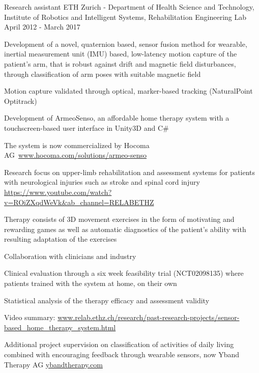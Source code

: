 \begin{cventries}
  \cventry
    {Research assistant} %
    {ETH Zurich - Department of Health Science and Technology, Institute of Robotics and Intelligent Systems, Rehabilitation Engineering Lab} %
    {} %
    {April 2012 - March 2017} %
    {
      \begin{cvitems} %
        \item{Development of a novel, quaternion based, {sensor fusion} method for wearable, inertial measurement unit ({IMU}) based, low-latency motion capture of the patient’s arm, that is robust against drift and magnetic field disturbances, through classification of arm poses with suitable magnetic field}
        \item{Motion capture validated through {optical, marker-based tracking} (NaturalPoint Optitrack)}
        \item {Development of ArmeoSenso, an affordable home therapy system with a touchscreen-based user interface in {Unity3D} and {C\#}}
        \item{The system is now commercialized by Hocoma AG\ \url{www.hocoma.com/solutions/armeo-senso}}
        \item {Research focus on upper-limb rehabilitation and assessment systems for patients with neurological injuries such as stroke and spinal cord injury \url{https://www.youtube.com/watch?v=ROiZXqdWeVk&ab_channel=RELABETHZ}}        
        \item{Therapy consists of 3D movement exercises in the form of motivating and rewarding games as well as automatic diagnostics of the patient’s ability with resulting adaptation of the exercises}
        \item{Collaboration with clinicians and industry}
        \item {Clinical evaluation through a six week feasibility trial (NCT02098135) where patients trained with the system at home, on their own} 
        \item{Statistical analysis of the therapy efficacy and assessment validity}
        \item{Video summary: \url{www.relab.ethz.ch/research/past-research-projects/sensor-based_home_therapy_system.html}}
        \item{Additional project supervision on classification of activities of daily living combined with encouraging feedback through wearable sensors, now Yband Therapy AG \url{ybandtherapy.com}}
      \end{cvitems}
    }


\end{cventries}
